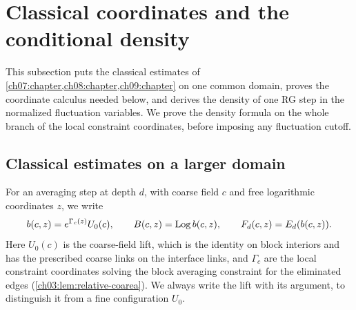 \section{Classical coordinates and the conditional density}\label{ch11:sec:classical}

This subsection puts the classical estimates of \cref{ch07:chapter,ch08:chapter,ch09:chapter} on one common domain, proves the coordinate calculus needed below, and derives the density of one RG step in the normalized fluctuation variables. We prove the density formula on the whole branch of the local constraint coordinates, before imposing any fluctuation cutoff.

\subsection{Classical estimates on a larger domain}

For an averaging step at depth $d$, with coarse field $c$ and free logarithmic coordinates $z$, we write
\[
 b(c,z)=e^{\Gamma_c(z)}U_0(c),\qquad B(c,z)=\operatorname{Log} b(c,z),\qquad F_d(c,z)=E_d(b(c,z)).
\]
Here $U_0(c)$ is the coarse-field lift, which is the identity on block interiors and has the prescribed coarse links on the interface links, and $\Gamma_c$ are the local constraint coordinates solving the block averaging constraint for the eliminated edges (\cref{ch03:lem:relative-coarea}). We always write the lift with its argument, to distinguish it from a fine configuration $U_0$.

